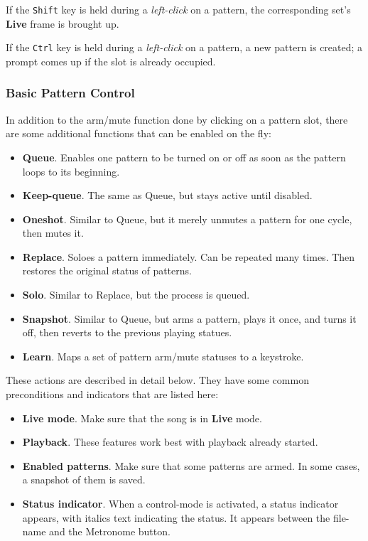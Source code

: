    If the \texttt{Shift} key is held during a
   \textsl{left-click} on a pattern,
   the corresponding set's \textbf{Live} frame is brought up.

   If the \texttt{Ctrl} key is held during a
   \textsl{left-click} on a pattern,
   a new pattern is created; a prompt comes up if the slot
   is already occupied.

\subsubsection{Basic Pattern Control}
\label{subsubsec:patterns_basic_pattern_control}

   In addition to the arm/mute function done by clicking on a pattern slot,
   there are some additional functions that can be enabled on the fly:

   \begin{itemize}
      \item \textbf{Queue}.
         Enables one pattern to be turned on or off as soon as the pattern
         loops to its beginning.
      \item \textbf{Keep-queue}.
         The same as Queue, but stays active until disabled.
      \item \textbf{Oneshot}.
         Similar to Queue, but it merely unmutes a pattern for one cycle,
         then mutes it.
      \item \textbf{Replace}.
         Soloes a pattern immediately.
         Can be repeated many times.
         Then restores the original status of patterns.
      \item \textbf{Solo}.
         Similar to Replace, but the process is queued.
      \item \textbf{Snapshot}.
         Similar to Queue, but arms a pattern, plays it once, and turns it
         off, then reverts to the previous playing statues.
      \item \textbf{Learn}.
         Maps a set of pattern arm/mute statuses to a keystroke.
   \end{itemize}

   These actions are described in detail below.
   They have some common preconditions and indicators that are listed here:

   \begin{itemize}
      \item \textbf{Live mode}.
         Make sure that the song is in \textbf{Live} mode.
      \item \textbf{Playback}.
         These features work best with playback already started.
      \item \textbf{Enabled patterns}.
         Make sure that some patterns are armed.
         In some cases, a snapshot of them is saved.
      \item \textbf{Status indicator}.
         When a control-mode is activated, a status indicator appears, with
         italics text indicating the status. It appears between the
         file-name and the Metronome button.
   \end{itemize}

